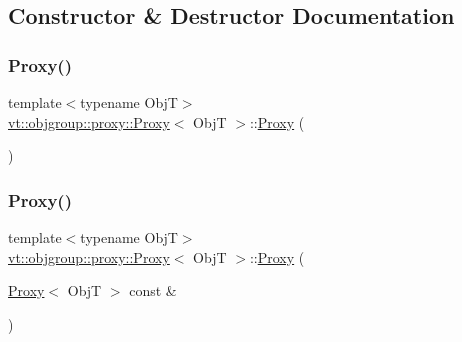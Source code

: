 \subsection{Constructor \& Destructor Documentation}
\mbox{\label{structvt_1_1objgroup_1_1proxy_1_1_proxy_a5450776d9cabb2556765c0d0227c9589}} 
\subsubsection{\texorpdfstring{Proxy()}{Proxy()}\hspace{0.1cm}{\footnotesize\ttfamily [1/4]}}
{\footnotesize\ttfamily template$<$typename ObjT$>$ \\
\hyperlink{structvt_1_1objgroup_1_1proxy_1_1_proxy}{vt\+::objgroup\+::proxy\+::\+Proxy}$<$ ObjT $>$\+::\hyperlink{structvt_1_1objgroup_1_1proxy_1_1_proxy}{Proxy} (\begin{DoxyParamCaption}{ }\end{DoxyParamCaption})\hspace{0.3cm}{\ttfamily [default]}}

\mbox{\label{structvt_1_1objgroup_1_1proxy_1_1_proxy_ad12a9b75a3c4844144d7a159b11af5ec}} 
\subsubsection{\texorpdfstring{Proxy()}{Proxy()}\hspace{0.1cm}{\footnotesize\ttfamily [2/4]}}
{\footnotesize\ttfamily template$<$typename ObjT$>$ \\
\hyperlink{structvt_1_1objgroup_1_1proxy_1_1_proxy}{vt\+::objgroup\+::proxy\+::\+Proxy}$<$ ObjT $>$\+::\hyperlink{structvt_1_1objgroup_1_1proxy_1_1_proxy}{Proxy} (\begin{DoxyParamCaption}\item[{\hyperlink{structvt_1_1objgroup_1_1proxy_1_1_proxy}{Proxy}$<$ ObjT $>$ const \&}]{ }\end{DoxyParamCaption})\hspace{0.3cm}{\ttfamily [default]}}

